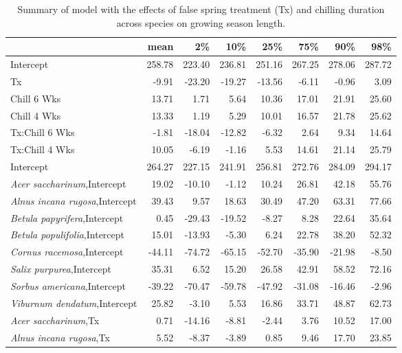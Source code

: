 \documentclass{article}\usepackage[]{graphicx}\usepackage[]{color}
\begin{document}
\newpage
\begin{longtable}{lrrrrrrr}
\caption{Summary of model with the effects of false spring treatment (Tx) and chilling duration across species on growing season length.} \\ 
  \hline
 & mean & 2\% & 10\% & 25\% & 75\% & 90\% & 98\% \\ 
  \hline \endhead  \hline
Intercept & 258.78 & 223.40 & 236.81 & 251.16 & 267.25 & 278.06 & 287.72 \\ 
  Tx & -9.91 & -23.20 & -19.27 & -13.56 & -6.11 & -0.96 & 3.09 \\ 
  Chill 6 Wks & 13.71 & 1.71 & 5.64 & 10.36 & 17.01 & 21.91 & 25.60 \\ 
  Chill 4 Wks & 13.33 & 1.19 & 5.29 & 10.01 & 16.57 & 21.78 & 25.62 \\ 
  Tx:Chill 6 Wks & -1.81 & -18.04 & -12.82 & -6.32 & 2.64 & 9.34 & 14.64 \\ 
  Tx:Chill 4 Wks & 10.05 & -6.19 & -1.16 & 5.53 & 14.61 & 21.14 & 25.79 \\ 
  Intercept & 264.27 & 227.15 & 241.91 & 256.81 & 272.76 & 284.09 & 294.17 \\ 
  \textit{Acer saccharinum},Intercept & 19.02 & -10.10 & -1.12 & 10.24 & 26.81 & 42.18 & 55.76 \\ 
  \textit{Alnus incana rugosa},Intercept & 39.43 & 9.57 & 18.63 & 30.49 & 47.20 & 63.31 & 77.66 \\ 
  \textit{Betula papyrifera},Intercept & 0.45 & -29.43 & -19.52 & -8.27 & 8.28 & 22.64 & 35.64 \\ 
  \textit{Betula populifolia},Intercept & 15.01 & -13.93 & -5.30 & 6.24 & 22.78 & 38.20 & 52.32 \\ 
  \textit{Cornus racemosa},Intercept & -44.11 & -74.72 & -65.15 & -52.70 & -35.90 & -21.98 & -8.50 \\ 
  \textit{Salix purpurea},Intercept & 35.31 & 6.52 & 15.20 & 26.58 & 42.91 & 58.52 & 72.16 \\ 
  \textit{Sorbus americana},Intercept & -39.22 & -70.47 & -59.78 & -47.92 & -31.08 & -16.46 & -2.96 \\ 
  \textit{Viburnum dendatum},Intercept & 25.82 & -3.10 & 5.53 & 16.86 & 33.71 & 48.87 & 62.73 \\ 
  \textit{Acer saccharinum},Tx & 0.71 & -14.16 & -8.81 & -2.44 & 3.76 & 10.52 & 17.00 \\ 
  \textit{Alnus incana rugosa},Tx & 5.52 & -8.37 & -3.89 & 0.85 & 9.46 & 17.70 & 23.85 \\ 

\end{longtable}
\end{document}
